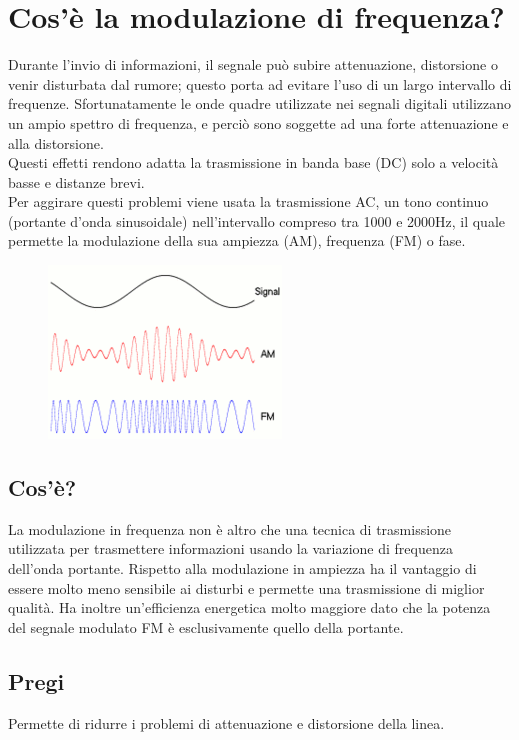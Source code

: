 \section{Cos’è la modulazione di frequenza?}

Durante l’invio di informazioni, il segnale può subire attenuazione, distorsione o venir disturbata dal rumore;
questo porta ad evitare l’uso di un largo intervallo di frequenze.
Sfortunatamente le onde quadre utilizzate nei segnali digitali utilizzano un ampio spettro di frequenza, e perciò sono soggette ad una forte attenuazione e alla distorsione.\\
Questi effetti rendono adatta la trasmissione in banda base (DC) solo a velocità basse e distanze brevi.\\
Per aggirare questi problemi viene usata la trasmissione AC, un tono continuo (portante d’onda sinusoidale) nell’intervallo compreso tra 1000 e 2000Hz,
il quale permette la modulazione della sua ampiezza (AM), frequenza (FM) o fase.

\begin{figure}[H]
\centering
\includegraphics[scale=1]{res/img/5_modulazione.png}
\end{figure}
\subsection{Cos'è?}
La modulazione in frequenza non è altro che una tecnica di trasmissione utilizzata per trasmettere informazioni usando la variazione di frequenza dell’onda portante.
Rispetto alla modulazione in ampiezza ha il vantaggio di essere molto meno sensibile ai disturbi e permette una trasmissione di miglior qualità.
Ha inoltre un’efficienza energetica molto maggiore dato che la potenza del segnale modulato FM è esclusivamente quello della portante.

\subsection{Pregi}
Permette di ridurre i problemi di attenuazione e distorsione della linea.
